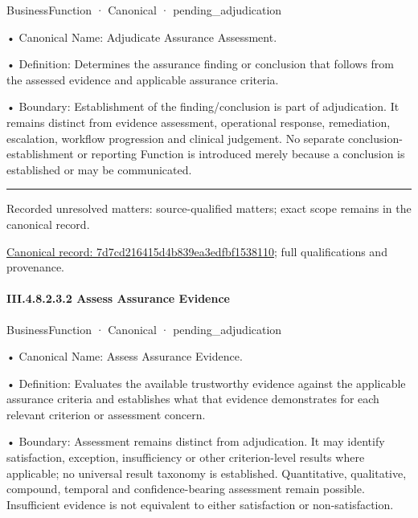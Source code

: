 \label{element:7d7cd216415d4b839ea3edfbf1538110}
{\small BusinessFunction · Canonical · pending\_adjudication}\par

•
Canonical Name: Adjudicate Assurance Assessment.



•
Definition: Determines the assurance finding or conclusion that follows from the assessed evidence and applicable assurance criteria.



•
Boundary: Establishment of the finding/conclusion is part of adjudication. It remains distinct from evidence assessment, operational response, remediation, escalation, workflow progression and clinical judgement. No separate conclusion-establishment or reporting Function is introduced merely because a conclusion is established or may be communicated.



\medskip\hrule\medskip

{\small Recorded unresolved matters: source-qualified matters; exact scope remains in the canonical record.}\par
{\footnotesize \href{../../../../../../../../continuum/business/business-function/7d7cd216415d4b839ea3edfbf1538110.md}{Canonical record: 7d7cd216415d4b839ea3edfbf1538110}; full qualifications and provenance.}\par
\paragraph*{III.4.8.2.3.2 Assess Assurance Evidence}
\label{navigation:III.4.8.2.3.2}

\label{element:e1f6402d47c0455b95b45a1a4d393484}
{\small BusinessFunction · Canonical · pending\_adjudication}\par

•
Canonical Name: Assess Assurance Evidence.



•
Definition: Evaluates the available trustworthy evidence against the applicable assurance criteria and establishes what that evidence demonstrates for each relevant criterion or assessment concern.



•
Boundary: Assessment remains distinct from adjudication. It may identify satisfaction, exception, insufficiency or other criterion-level results where applicable; no universal result taxonomy is established. Quantitative, qualitative, compound, temporal and confidence-bearing assessment remain possible. Insufficient evidence is not equivalent to either satisfaction or non-satisfaction.



